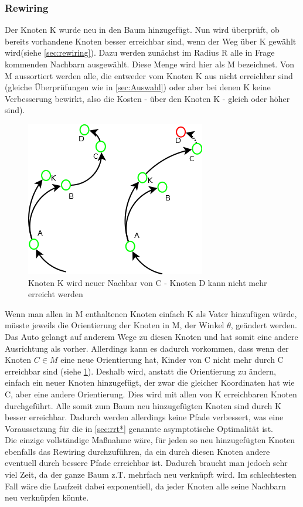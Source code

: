\subsubsection{Rewiring}
Der Knoten K wurde neu in den Baum hinzugefügt. Nun wird überprüft, ob bereits vorhandene Knoten besser erreichbar sind, wenn der Weg über K gewählt wird(siehe \ref{sec:rewiring}).
Dazu werden zunächst im Radius R alle in Frage kommenden Nachbarn ausgewählt. Diese Menge wird hier als M bezeichnet. Von M aussortiert werden alle, die entweder vom Knoten K aus nicht erreichbar sind (gleiche Überprüfungen wie in \ref{sec:Auswahl}) oder aber bei denen K keine Verbesserung bewirkt, also die Kosten - über den Knoten K - gleich oder höher sind). \\
\begin{figure}
\centering
\label{fig:rewiringNodeInvalid}
\includegraphics[scale=0.7]{Bilder/Rewiring_ungueltige_knoten.png} 
\caption{Knoten K wird neuer Nachbar von C - Knoten D kann nicht mehr erreicht werden}
\end{figure}

Wenn man allen in M enthaltenen Knoten einfach K als Vater hinzufügen würde, müsste jeweils die Orientierung der Knoten in M, der Winkel $\theta$, geändert werden. Das Auto gelangt auf anderem Wege zu diesen Knoten und hat somit eine andere Ausrichtung als vorher. Allerdings kann es dadurch vorkommen, dass wenn der Knoten $C \in M$ eine neue Orientierung hat, Kinder von C nicht mehr durch C erreichbar sind (siehe \ref{fig:rewiringNodeInvalid}). Deshalb wird, anstatt die Orientierung zu ändern, einfach ein neuer Knoten hinzugefügt, der zwar die gleicher Koordinaten hat wie C, aber eine andere Orientierung. Dies wird mit allen von K erreichbaren Knoten durchgeführt. Alle somit zum Baum neu hinzugefügten Knoten sind durch K besser erreichbar. Dadurch werden allerdings keine Pfade verbessert, was eine Voraussetzung für die in \ref{sec:rrt*} genannte asymptotische Optimalität ist.\\
Die einzige vollständige Maßnahme wäre, für jeden so neu hinzugefügten Knoten ebenfalls das Rewiring durchzuführen, da ein durch diesen Knoten andere eventuell durch bessere Pfade erreichbar ist. Dadurch braucht man jedoch sehr viel Zeit, da der ganze Baum z.T. mehrfach neu verknüpft wird. Im schlechtesten Fall wäre die Laufzeit dabei exponentiell, da jeder Knoten alle seine Nachbarn neu verknüpfen könnte.
